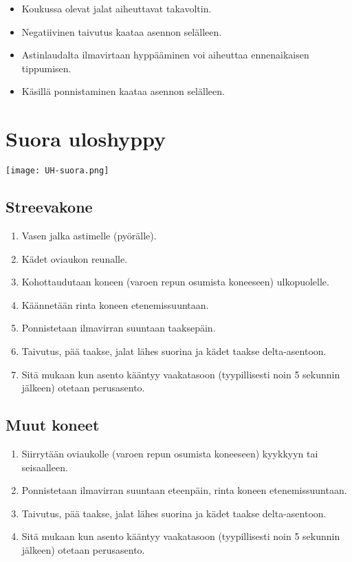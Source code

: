 \begin{itemize}
\item  Koukussa olevat jalat aiheuttavat takavoltin. 
\item  Negatiivinen taivutus kaataa asennon selälleen. 
\item  Astinlaudalta ilmavirtaan hyppääminen voi aiheuttaa ennenaikaisen tippumisen. 
\item  Käsillä ponnistaminen kaataa asennon selälleen. 
\end{itemize}
\section{ Suora uloshyppy }
\label{uloshyppytyylit-suora-uloshyppy}


\begin{Figure}\centering\texttt{[image: UH-suora.png]}\end{Figure} 

\subsection{ Streevakone }
\label{uloshyppytyylit-streevakone}

\begin{enumerate}[label=\bfseries \arabic*)]
\item  Vasen jalka astimelle (pyörälle). 
\item  Kädet oviaukon reunalle. 
\item  Kohottaudutaan koneen (varoen repun osumista koneeseen) ulkopuolelle. 
\item  Käännetään rinta koneen etenemissuuntaan. 
\item  Ponnistetaan ilmavirran suuntaan taaksepäin. 
\item  Taivutus, pää taakse, jalat lähes suorina ja kädet taakse delta-asentoon. 
\item  Sitä mukaan kun asento kääntyy vaakatasoon (tyypillisesti noin 5 sekunnin jälkeen) otetaan perusasento. 
\end{enumerate}
\subsection{ Muut koneet }
\label{uloshyppytyylit-muut-koneet}

\begin{enumerate}[label=\bfseries \arabic*)]
\item  Siirrytään oviaukolle (varoen repun osumista koneeseen) kyykkyyn tai seisaalleen. 
\item  Ponnistetaan ilmavirran suuntaan eteenpäin, rinta koneen etenemissuuntaan. 
\item  Taivutus, pää taakse, jalat lähes suorina ja kädet taakse delta-asentoon. 
\item  Sitä mukaan kun asento kääntyy vaakatasoon (tyypillisesti noin 5 sekunnin jälkeen) otetaan perusasento. 
\end{enumerate}

